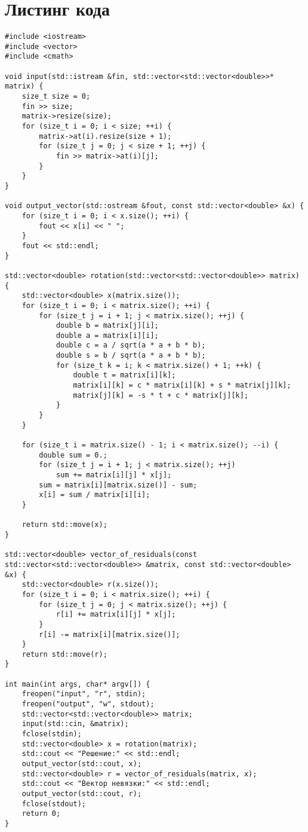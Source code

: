 \documentclass[11.4pt]{article}
\makeatletter
\newcommand{\verbatimfont}[1]{\renewcommand{\verbatim@font}{\ttfamily#1}}
\makeatother
\begin{document}
\section{Листинг кода}
\verbatimfont{\small}
\begin{verbatim}
#include <iostream>
#include <vector>
#include <cmath>

void input(std::istream &fin, std::vector<std::vector<double>>* matrix) {
    size_t size = 0;
    fin >> size;
    matrix->resize(size);
    for (size_t i = 0; i < size; ++i) {
        matrix->at(i).resize(size + 1);
        for (size_t j = 0; j < size + 1; ++j) {
            fin >> matrix->at(i)[j];
        }
    }
}

void output_vector(std::ostream &fout, const std::vector<double> &x) {
    for (size_t i = 0; i < x.size(); ++i) {
        fout << x[i] << " ";
    }
    fout << std::endl;
}

std::vector<double> rotation(std::vector<std::vector<double>> matrix) {
    std::vector<double> x(matrix.size());
    for (size_t i = 0; i < matrix.size(); ++i) {
        for (size_t j = i + 1; j < matrix.size(); ++j) {
            double b = matrix[j][i];
            double a = matrix[i][i];
            double c = a / sqrt(a * a + b * b);
            double s = b / sqrt(a * a + b * b);
            for (size_t k = i; k < matrix.size() + 1; ++k) {
                double t = matrix[i][k];
                matrix[i][k] = c * matrix[i][k] + s * matrix[j][k];
                matrix[j][k] = -s * t + c * matrix[j][k];
            }
        }
    }

    for (size_t i = matrix.size() - 1; i < matrix.size(); --i) {
        double sum = 0.;
        for (size_t j = i + 1; j < matrix.size(); ++j)
            sum += matrix[i][j] * x[j];
        sum = matrix[i][matrix.size()] - sum;
        x[i] = sum / matrix[i][i];
    }

    return std::move(x);
}

std::vector<double> vector_of_residuals(const std::vector<std::vector<double>> &matrix, const std::vector<double> &x) {
    std::vector<double> r(x.size());
    for (size_t i = 0; i < matrix.size(); ++i) {
        for (size_t j = 0; j < matrix.size(); ++j) {
            r[i] += matrix[i][j] * x[j];
        }
        r[i] -= matrix[i][matrix.size()];
    }
    return std::move(r);
}

int main(int args, char* argv[]) {
    freopen("input", "r", stdin);
    freopen("output", "w", stdout);
    std::vector<std::vector<double>> matrix;
    input(std::cin, &matrix);
    fclose(stdin);
    std::vector<double> x = rotation(matrix);
    std::cout << "Решение:" << std::endl;
    output_vector(std::cout, x);
    std::vector<double> r = vector_of_residuals(matrix, x);
    std::cout << "Вектор невязки:" << std::endl;
    output_vector(std::cout, r);
    fclose(stdout);
    return 0;
}
\end{verbatim}
\end{document}
